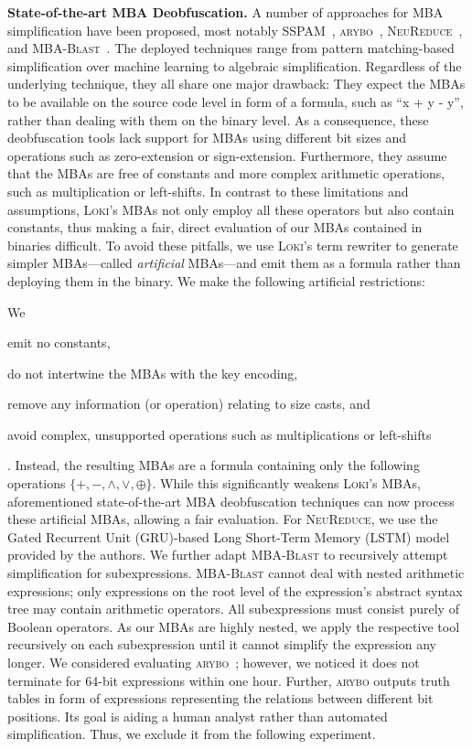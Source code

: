 \documentclass[letterpaper,twocolumn,10pt]{article}
\theoremstyle{customexample}
\theoremstyle{customexperiment}
\newcommand{\loki}{\textsc{Loki}\xspace}
\newcommand{\neureduce}{\textsc{NeuReduce}\xspace}
\newcommand{\sspam}{\textsc{SSPAM}\xspace}
\newcommand{\arybo}{\textsc{arybo}\xspace}
\newcommand{\mbablast}{\textsc{MBA-Blast}\xspace}
\begin{document}
\textbf{State-of-the-art MBA Deobfuscation.} A number of approaches for MBA simplification have been proposed, most notably \sspam~\cite{eyrolles2016defeating}, \arybo~\cite{guinet2016arybo}, \neureduce~\cite{feng2020neureduce}, and \mbablast~\cite{liu2021mbablast}. The deployed techniques range from pattern matching-based simplification over machine learning to algebraic simplification. Regardless of the underlying technique, they all share one major drawback: They expect the MBAs to be available on the source code level in form of a formula, such as \enquote{x + y - y}, rather than dealing with them on the binary level. As a consequence, these deobfuscation tools lack support for MBAs using different bit sizes and operations such as zero-extension or sign-extension. Furthermore, they assume that the MBAs are free of constants and more complex arithmetic operations, such as multiplication or left-shifts. In contrast to these limitations and assumptions, \loki's MBAs not only employ all these operators but also contain constants, thus making a fair, direct evaluation of our MBAs contained in binaries difficult. 
To avoid these pitfalls, we use \loki's term rewriter to generate simpler MBAs---called \textit{artificial} MBAs---and emit them as a formula rather than deploying them in the binary. We make the following artificial restrictions: \begin{inparaenum}[(a)] We \item emit no constants, \item do not intertwine the MBAs with the key encoding, \item remove any information (or operation) relating to size casts, and \item avoid complex, unsupported operations such as multiplications or left-shifts\end{inparaenum}. Instead, the resulting MBAs are a formula containing only the following operations $\{+, -, \land, \lor, \oplus\}$. While this significantly weakens \loki's MBAs, aforementioned state-of-the-art MBA deobfuscation techniques can now process these artificial MBAs, allowing a fair evaluation.
For \neureduce, we use the Gated Recurrent Unit (GRU)-based Long Short-Term Memory (LSTM) model provided by the authors. We further adapt \mbablast to recursively attempt simplification for subexpressions. \mbablast cannot deal with nested arithmetic expressions; only expressions on the root level of the expression's abstract syntax tree may contain arithmetic operators. All subexpressions must consist purely of Boolean operators. As our MBAs are highly nested, we apply the respective tool recursively on each subexpression until it cannot simplify the expression any longer. We considered evaluating \arybo~\cite{guinet2016arybo}; however, we noticed it does not terminate for 64-bit expressions within one hour. Further, \arybo outputs truth tables in form of expressions representing the relations between different bit positions. Its goal is aiding a human analyst rather than automated simplification. Thus, we exclude it from the following experiment.
\end{document}

